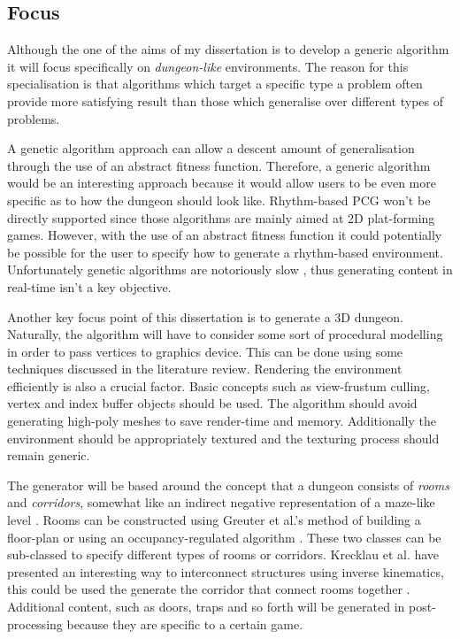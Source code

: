 \documentclass{ueacmpstyle}
\begin{document}
\subsection{Focus}
Although the one of the aims of my dissertation is to develop a generic algorithm it will focus specifically on {\em dungeon-like} environments. The reason for this specialisation is that algorithms which target a specific type a problem often provide more satisfying result than those which generalise over different types of problems. 

A genetic algorithm approach can allow a descent amount of generalisation through the use of an abstract fitness function. Therefore, a generic algorithm would be an interesting approach because it would allow users to be even more specific as to how the dungeon should look like. Rhythm-based PCG won't be directly supported since those algorithms are mainly aimed at 2D plat-forming games. However, with the use of an abstract fitness function it could potentially be possible for the user to specify how to generate a rhythm-based environment. Unfortunately genetic algorithms are notoriously slow \citep{DBLP:conf/cig/TogeliusPBWHY10}, thus generating content in real-time isn't a key objective.

Another key focus point of this dissertation is to generate a 3D dungeon. Naturally, the algorithm will have to consider some sort of procedural modelling in order to pass vertices to graphics device. This can be done using some techniques discussed in the literature review. Rendering the environment efficiently is also a crucial factor. Basic concepts such as view-frustum culling, vertex and index buffer objects should be used. The algorithm should avoid generating high-poly meshes to save render-time and memory. Additionally the environment should be appropriately textured and the texturing process should remain generic.

The generator will be based around the concept that a dungeon consists of {\em rooms} and {\em corridors}, somewhat like an indirect negative representation of a maze-like level \citep{DBLP:journals/cim/AshlockLM11}. Rooms can be constructed using Greuter et al.'s method of building a floor-plan \citep{DBLP:conf/graphite/GreuterPSL03} or using an occupancy-regulated algorithm \citep{DBLP:conf/cig/MawhorterM10}. These two classes can be sub-classed to specify different types of rooms or corridors. Krecklau et al. have presented an interesting way to interconnect structures using inverse kinematics, this could be used the generate the corridor that connect rooms together \citep{DBLP:journals/cgf/KrecklauK11}. Additional content, such as doors, traps and so forth will be generated in post-processing because they are specific to a certain game.
\end{document}
